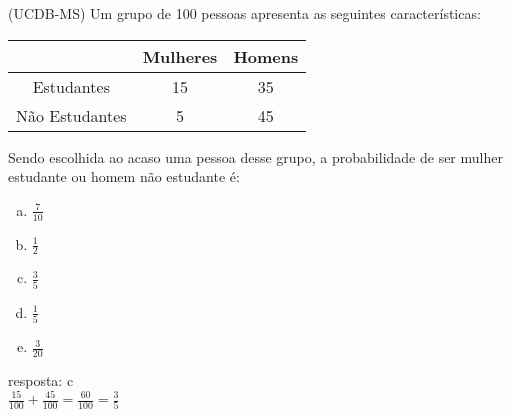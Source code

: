\begin{ex}
 (UCDB-MS) Um grupo de 100 pessoas apresenta as seguintes características:
\begin{center}
\begin{tabular}{|c|c|c|} \hline
& Mulheres & Homens \\ \hline
Estudantes & 15 & 35 \\ \hline
Não Estudantes & 5 & 45 \\ \hline
\end{tabular}
\end{center}
Sendo escolhida ao acaso uma pessoa desse grupo, a probabilidade de ser mulher estudante ou homem não estudante é:
    \begin{enumerate}[(a)]
    \item $\frac{7}{10}$
    \item $\frac{1}{2}$
    \item $\frac{3}{5}$
    \item $\frac{1}{5}$
    \item $\frac{3}{20}$
    \end{enumerate}
      \begin{sol}
        resposta: c \\
        $\frac{15}{100}+\frac{45}{100}=\frac{60}{100}=\frac{3}{5}$
      \end{sol}
\end{ex}